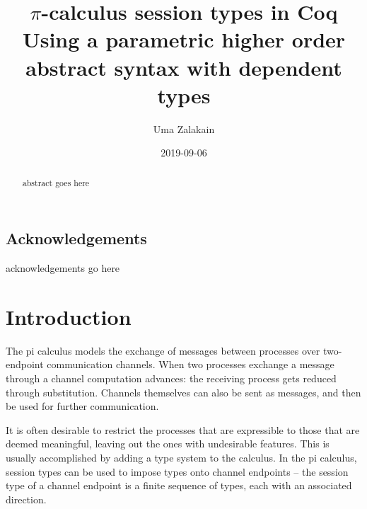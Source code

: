 \documentclass{mproj}
\begin{document}
\title{$\pi$-calculus session types in Coq \\
\large Using a parametric higher order abstract syntax with dependent types}
\author{Uma Zalakain}
\date{2019-09-06}
\maketitle

\begin{abstract}
abstract goes here
\end{abstract}

\educationalconsent
\vfill{}
\doclicenseThis
\newpage

\section*{Acknowledgements}

acknowledgements go here

\tableofcontents

\chapter{Introduction}\label{intro}

The pi calculus models the exchange of messages between processes over
two-endpoint communication channels. When two processes exchange a message
through a channel computation advances: the receiving process gets reduced
through substitution. Channels themselves can also be sent as messages, and then
be used for further communication.

It is often desirable to restrict the processes that are expressible to those
that are deemed meaningful, leaving out the ones with undesirable features. This
is usually accomplished by adding a type system to the calculus. In the pi
calculus, session types can be used to impose types onto channel endpoints --
the session type of a channel endpoint is a finite sequence of types, each with
an associated direction.
\end{document}
